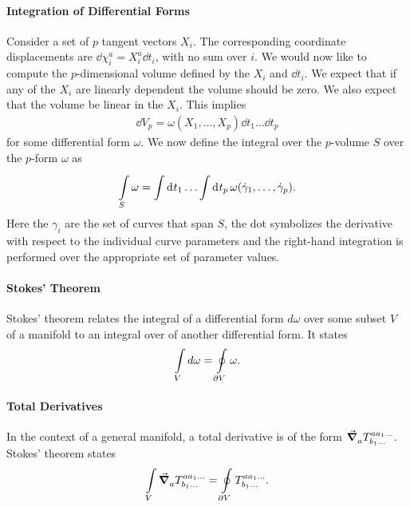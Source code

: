 \paragraph{Integration of Differential Forms}
Consider a set of $p$ tangent vectors $X_{i}$. The corresponding coordinate displacements are $\dd{\chi_{i}^{a}} = X_{i}^{a}\dd{t_{i}}$, with no sum over $i$. We would now like to compute the $p$-dimensional volume defined by the $X_{i}$ and $\dd{t_{i}}$. We expect that if any of the $X_{i}$ are linearly dependent the volume should be zero. We also expect that the volume be linear in the $X_{i}$. This implies
\begin{align*}
	\dd{V_{p}} = \omega(X_{1}, \dots, X_{p})\dd{t_{1}}\dots\dd{t_{p}}
\end{align*}
for some differential form $\omega$. We now define the integral over the $p$-volume $S$ over the $p$-form $\omega$ as
\begin{align*}
	\minteg{S}{\omega} = \integ{}{}{t_{1}}{\dots \integ{}{}{t_{p}}{\omega(\dot{\gamma}_{1},\dots, \dot{\gamma}_{p})}}.
\end{align*}
Here the $\gamma_{i}$ are the set of curves that span $S$, the dot symbolizes the derivative with respect to the individual curve parameters and the right-hand integration is performed over the appropriate set of parameter values.

\paragraph{Stokes' Theorem}
Stokes' theorem relates the integral of a differential form $d\omega$ over some subset $V$ of a manifold to an integral over  of another differential form.
It states
\begin{align*}
	\int\limits_{V}d\omega = \oint\limits_{\partial V}\omega.
\end{align*}

\paragraph{Total Derivatives}
In the context of a general manifold, a total derivative is of the form $\grad_{a}^{}{T^{aa_{1}\dots}_{b_{1}\dots}}$. Stokes' theorem states
\begin{align*}
	\int\limits_{V}\grad_{a}^{}{T^{aa_{1}\dots}_{b_{1}\dots}} = \oint\limits_{\partial V}T^{aa_{1}\dots}_{b_{1}\dots}.
\end{align*}
